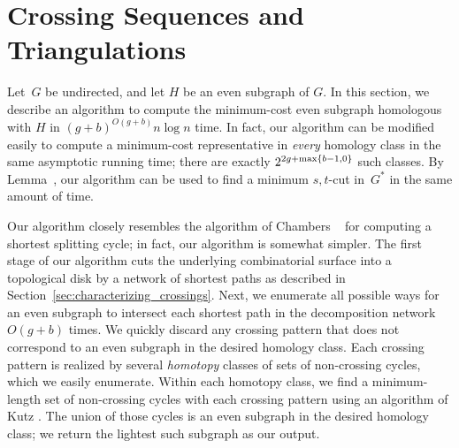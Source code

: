 \section{Crossing Sequences and Triangulations}
\label{sec:crossing}


Let~$G$ be undirected, and let $H$
be an even subgraph of $G$.  In this section, we describe an
algorithm to compute the minimum-cost even subgraph homologous with
$H$ in $(g+b)^{O(g+b)}n\log n$ time.  In fact, our algorithm can be
modified easily to compute a minimum-cost representative in
\emph{every} homology class in the same asymptotic running time;
there are exactly $2^{2g+\max\{ b-1,0 \}}$ such classes.
By Lemma~\cite{lem:surface-st-cut}, our algorithm can be used to find a minimum $s,t$-cut in~$G^*$ in the same amount of time.

Our algorithm closely resembles the algorithm of Chambers \etal~\cite{ccelw-scsih-08} for computing a shortest splitting cycle; in fact, our algorithm is somewhat simpler.  The first stage of our algorithm cuts the underlying combinatorial surface into a topological disk by a network of shortest paths as described in Section~\ref{sec:characterizing_crossings}.  Next, we enumerate all possible ways for an even subgraph to intersect each shortest path in the decomposition network $O(g+b)$ times.  We quickly discard any crossing pattern that does not correspond to an even subgraph in the desired homology class.  Each crossing pattern is realized by several \emph{homotopy} classes of sets of non-crossing cycles, which we easily enumerate.  Within each homotopy class, we find a minimum-length set of non-crossing cycles with each crossing pattern using an algorithm of Kutz \cite{k-csnco-06}.  The union of those cycles is an even subgraph in the desired homology class; we return the lightest such subgraph as our output.

